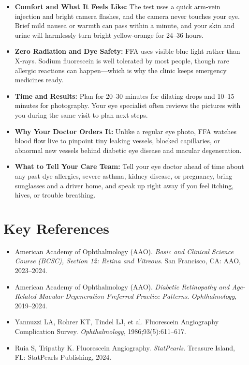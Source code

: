 \begin{itemize}
    \item \textbf{Comfort and What It Feels Like:} The test uses a quick arm-vein injection and bright camera flashes, and the camera never touches your eye. Brief mild nausea or warmth can pass within a minute, and your skin and urine will harmlessly turn bright yellow-orange for 24--36 hours.
    \item \textbf{Zero Radiation and Dye Safety:} FFA uses visible blue light rather than X-rays. Sodium fluorescein is well tolerated by most people, though rare allergic reactions can happen---which is why the clinic keeps emergency medicines ready.
    \item \textbf{Time and Results:} Plan for 20--30 minutes for dilating drops and 10--15 minutes for photography. Your eye specialist often reviews the pictures with you during the same visit to plan next steps.
    \item \textbf{Why Your Doctor Orders It:} Unlike a regular eye photo, FFA watches blood flow live to pinpoint tiny leaking vessels, blocked capillaries, or abnormal new vessels behind diabetic eye disease and macular degeneration.
    \item \textbf{What to Tell Your Care Team:} Tell your eye doctor ahead of time about any past dye allergies, severe asthma, kidney disease, or pregnancy, bring sunglasses and a driver home, and speak up right away if you feel itching, hives, or trouble breathing.
\end{itemize}

\section{Key References}

\begin{itemize}
    \item American Academy of Ophthalmology (AAO). \textit{Basic and Clinical Science Course (BCSC), Section 12: Retina and Vitreous}. San Francisco, CA: AAO, 2023--2024.
    \item American Academy of Ophthalmology (AAO). \textit{Diabetic Retinopathy and Age-Related Macular Degeneration Preferred Practice Patterns}. \textit{Ophthalmology}, 2019--2024.
    \item Yannuzzi LA, Rohrer KT, Tindel LJ, et al. Fluorescein Angiography Complication Survey. \textit{Ophthalmology}, 1986;93(5):611--617.
    \item Ruia S, Tripathy K. Fluorescein Angiography. \textit{StatPearls}. Treasure Island, FL: StatPearls Publishing, 2024.
\end{itemize}
